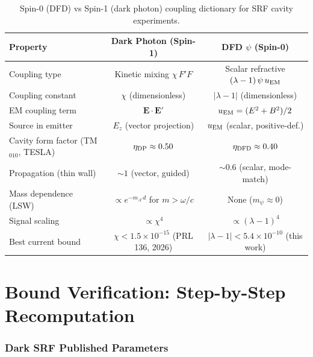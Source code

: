 \documentclass[11pt]{article}
\newcommand{\lam}{\lambda}
\newcommand{\lbone}{|\lambda - 1|}
\newcommand{\ee}[1]{\times 10^{#1}}
\theoremstyle{definition}
\theoremstyle{remark}
\begin{document}
\begin{table}[H]
\centering
\caption{Spin-0 (DFD) vs Spin-1 (dark photon) coupling dictionary
for SRF cavity experiments.}
\label{tab:dictionary}
\renewcommand{\arraystretch}{1.5}
\begin{tabular}{@{}p{3.5cm}cc@{}}
\toprule
\textbf{Property} & \textbf{Dark Photon (Spin-1)}
& \textbf{DFD $\psi$ (Spin-0)} \\
\midrule
Coupling type & Kinetic mixing $\chi\,F'F$
& Scalar refractive $(\lam-1)\,\psi\,u_{\rm EM}$ \\
Coupling constant & $\chi$ (dimensionless)
& $|\lam-1|$ (dimensionless) \\
EM coupling term & $\mathbf{E}\cdot\mathbf{E}'$
& $u_{\rm EM} = (E^2+B^2)/2$ \\
Source in emitter & $E_z$ (vector projection)
& $u_{\rm EM}$ (scalar, positive-def.) \\
Cavity form factor (TM$_{010}$, TESLA) & $\eta_{\rm DP} \approx 0.50$
& $\eta_{\rm DFD} \approx 0.40$ \\
Propagation (thin wall) & $\sim 1$ (vector, guided)
& $\sim 0.6$ (scalar, mode-match) \\
Mass dependence (LSW) & $\propto e^{-m_{A'}d}$ for $m > \omega/c$
& None ($m_\psi \approx 0$) \\
Signal scaling & $\propto \chi^4$
& $\propto (\lam-1)^4$ \\
Best current bound & $\chi < 1.5\ee{-15}$ (PRL 136, 2026)
& $\lbone < 5.4\ee{-10}$ (this work) \\
\bottomrule
\end{tabular}
\end{table}


\part{Bound Verification: Step-by-Step Recomputation}
\label{part:bound}

\section{Dark SRF Published Parameters}
\label{sec:params}
\end{document}
